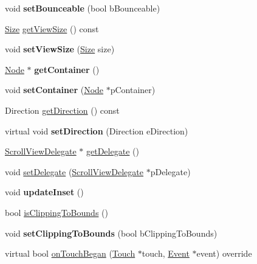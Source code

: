 \begin{DoxyCompactItemize}
\item 
\mbox{\label{classScrollView_ad21c34fd7ab0d5e7dfaa4fb5b35e8476}} 
void {\bfseries set\+Bounceable} (bool b\+Bounceable)
\item 
\hyperlink{classSize}{Size} \hyperlink{classScrollView_a84b4e4eb00a0877a2b2e71e3f1792b68}{get\+View\+Size} () const
\item 
\mbox{\label{classScrollView_af4e7c57f46b1654ecb64bfeba9979275}} 
void {\bfseries set\+View\+Size} (\hyperlink{classSize}{Size} size)
\item 
\mbox{\label{classScrollView_a88f619f933f85f6ceccae2151c7a740a}} 
\hyperlink{classNode}{Node} $\ast$ {\bfseries get\+Container} ()
\item 
\mbox{\label{classScrollView_a1379d2b9cd15a386f4c97f179d748dde}} 
void {\bfseries set\+Container} (\hyperlink{classNode}{Node} $\ast$p\+Container)
\item 
Direction \hyperlink{classScrollView_a29b46de3ff7003160ddb9b51f38e64c1}{get\+Direction} () const
\item 
\mbox{\label{classScrollView_acf607cfec58d1f0565178272b2b102b6}} 
virtual void {\bfseries set\+Direction} (Direction e\+Direction)
\item 
\hyperlink{classScrollViewDelegate}{Scroll\+View\+Delegate} $\ast$ \hyperlink{classScrollView_a49b7e183c04e572d20f20ac4d8a6d3c6}{get\+Delegate} ()
\item 
void \hyperlink{classScrollView_a450371726a685f72266384598630439c}{set\+Delegate} (\hyperlink{classScrollViewDelegate}{Scroll\+View\+Delegate} $\ast$p\+Delegate)
\item 
\mbox{\label{classScrollView_a0d2e0d1f2fcd7587a0bb45e1e142bc84}} 
void {\bfseries update\+Inset} ()
\item 
bool \hyperlink{classScrollView_a7c5e4247b97f795d120e68b1fbee751e}{is\+Clipping\+To\+Bounds} ()
\item 
\mbox{\label{classScrollView_aacdda6e1da63c3fd215e458e5e3e1b9a}} 
void {\bfseries set\+Clipping\+To\+Bounds} (bool b\+Clipping\+To\+Bounds)
\item 
virtual bool \hyperlink{classScrollView_a3b24de8c28e9cfd8a2f44d626266e1be}{on\+Touch\+Began} (\hyperlink{classTouch}{Touch} $\ast$touch, \hyperlink{classEvent}{Event} $\ast$event) override

\end{DoxyCompactItemize}
